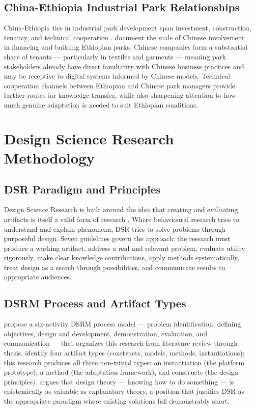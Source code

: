 \subsection{China-Ethiopia Industrial Park Relationships}

China-Ethiopia ties in industrial park development span investment, construction, tenancy, and technical cooperation \citep{Oqubay2019}. \citet{Negesa2022} document the scale of Chinese involvement in financing and building Ethiopian parks. Chinese companies form a substantial share of tenants --- particularly in textiles and garments --- meaning park stakeholders already have direct familiarity with Chinese business practices and may be receptive to digital systems informed by Chinese models. Technical cooperation channels between Ethiopian and Chinese park managers provide further routes for knowledge transfer, while also sharpening attention to how much genuine adaptation is needed to suit Ethiopian conditions.

\section{Design Science Research Methodology}

\subsection{DSR Paradigm and Principles}

Design Science Research is built around the idea that creating and evaluating artifacts is itself a valid form of research \citep{Hevner2004}. Where behavioural research tries to understand and explain phenomena, DSR tries to solve problems through purposeful design. Seven guidelines govern the approach: the research must produce a working artifact, address a real and relevant problem, evaluate utility rigorously, make clear knowledge contributions, apply methods systematically, treat design as a search through possibilities, and communicate results to appropriate audiences.

\subsection{DSRM Process and Artifact Types}

\citet{Peffers2007} propose a six-activity DSRM process model --- problem identification, defining objectives, design and development, demonstration, evaluation, and communication --- that organizes this research from literature review through thesis. \citet{March1995} identify four artifact types (constructs, models, methods, instantiations); this research produces all three non-trivial types: an instantiation (the platform prototype), a method (the adaptation framework), and constructs (the design principles). \citet{Gregor2013} argues that design theory --- knowing how to do something --- is epistemically as valuable as explanatory theory, a position that justifies DSR as the appropriate paradigm where existing solutions fall demonstrably short.

